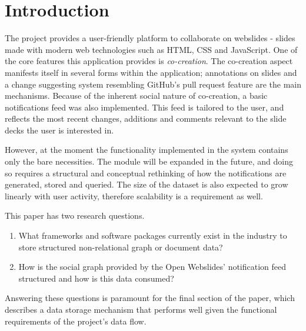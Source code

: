 
\section{Introduction} %
\label{sec:introduction}


The \textcite{OpenWebslides} project provides a user-friendly platform to collaborate on webslides - slides made with modern web technologies such as HTML, CSS and JavaScript. One of the core features this application provides is \emph{co-creation}. The co-creation aspect manifests itself in several forms within the application; annotations on slides and a change suggesting system resembling GitHub's pull request feature are the main mechanisms. Because of the inherent social nature of co-creation, a basic notifications feed was also implemented. This feed is tailored to the user, and reflects the most recent changes, additions and comments relevant to the slide decks the user is interested in.

However, at the moment the functionality implemented in the system contains only the bare necessities. The module will be expanded in the future, and doing so requires a structural and conceptual rethinking of how the notifications are generated, stored and queried. The size of the dataset is also expected to grow linearly with user activity, therefore scalability is a requirement as well.

This paper has two research questions.

\begin{enumerate}
	\item What frameworks and software packages currently exist in the industry to store structured non-relational graph or document data?
	\item How is the social graph provided by the Open Webslides' notification feed structured and how is this data consumed?
\end{enumerate}

Answering these questions is paramount for the final section of the paper, which describes a data storage mechanism that performs well given the functional requirements of the project's data flow.

